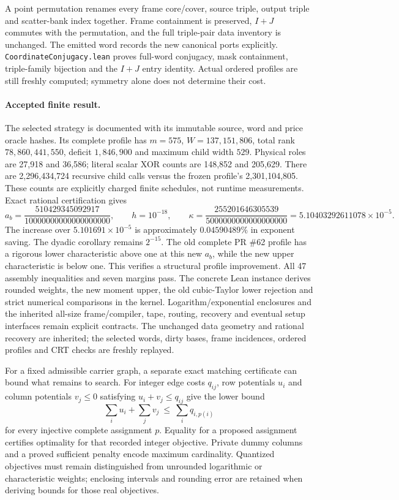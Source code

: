 \documentclass[11pt]{article}
\begin{document}
A point permutation renames every frame core/cover, source triple, output
triple and scatter-bank index together. Frame containment is preserved,
$I+J$ commutes with the permutation, and the full triple-pair data inventory
is unchanged. The emitted word records the new canonical ports explicitly.
\texttt{CoordinateConjugacy.lean} proves full-word conjugacy, mask containment,
triple-family bijection and the $I+J$ entry identity. Actual ordered profiles
are still freshly computed; symmetry alone does not determine their cost.

\paragraph{Accepted finite result.}
The selected strategy is documented with its immutable source, word and price
oracle hashes. Its complete profile has $m=575$, $W=137,151,806$,
total rank $78,860,441,550$, deficit $1,846,900$ and maximum child
width $529$. Physical roles are 27,918 and
36,586; literal scalar XOR counts are
148,852 and 205,629.
There are 2,296,434,724 recursive child calls versus the frozen profile's
2,301,104,805. These counts are explicitly charged finite schedules, not
runtime measurements. Exact rational certification gives
\[
 a_b=\frac{510429345092917}{10000000000000000000},\qquad h=10^{-18},\qquad
 \kappa=\frac{255201646305539}{5000000000000000000}=5.10403292611078\times10^{-5}.
\]
The increase over $5.101691\times10^{-5}$ is approximately
$0.04590489\%$ in exponent saving. The dyadic corollary remains $2^{-15}$.
The old complete PR \#62 profile has a rigorous lower characteristic above
one at this new $a_b$, while the new upper characteristic is below one.
This verifies a structural profile improvement. All 47 assembly inequalities
and seven margins pass. The concrete Lean instance derives rounded weights,
the new moment upper, the old cubic-Taylor lower rejection and strict numerical
comparisons in the kernel. Logarithm/exponential enclosures and the inherited
all-size frame/compiler, tape, routing, recovery and eventual setup interfaces
remain explicit contracts. The unchanged data geometry and rational recovery
are inherited; the selected words, dirty bases, frame incidences, ordered
profiles and CRT checks are freshly replayed.

For a fixed admissible carrier graph, a separate exact matching certificate
can bound what remains to search. For integer edge costs $q_{ij}$, row
potentials $u_i$ and column potentials $v_j\le0$ satisfying
$u_i+v_j\le q_{ij}$ give the lower bound
\[
 \sum_i u_i+\sum_j v_j\ \le\ \sum_i q_{i,p(i)}
\]
for every injective complete assignment $p$. Equality for a proposed
assignment certifies optimality for that recorded integer objective.
Private dummy columns and a proved sufficient penalty encode maximum
cardinality. Quantized objectives must remain distinguished from
unrounded logarithmic or characteristic weights; enclosing intervals and
rounding error are retained when deriving bounds for those real objectives.
\end{document}
